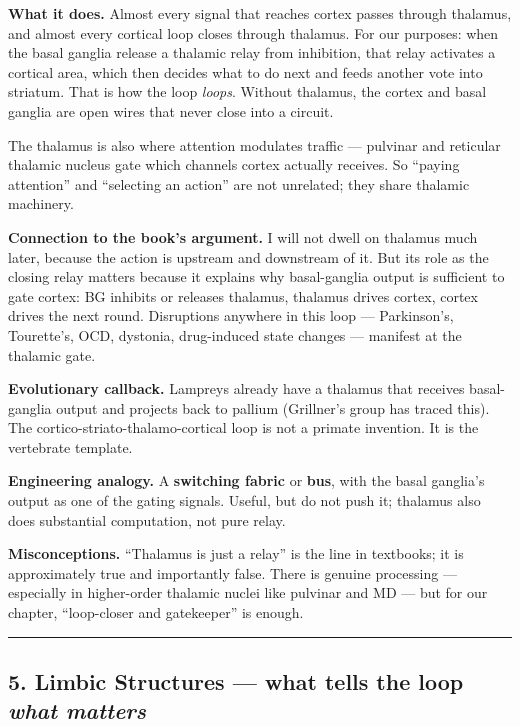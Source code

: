 \textbf{What it does.} Almost every signal that reaches cortex passes through thalamus, and almost every cortical loop closes through thalamus. For our purposes: when the basal ganglia release a thalamic relay from inhibition, that relay activates a cortical area, which then decides what to do next and feeds another vote into striatum. That is how the loop \emph{loops}. Without thalamus, the cortex and basal ganglia are open wires that never close into a circuit.

The thalamus is also where attention modulates traffic --- pulvinar and reticular thalamic nucleus gate which channels cortex actually receives. So ``paying attention'' and ``selecting an action'' are not unrelated; they share thalamic machinery.

\textbf{Connection to the book's argument.} I will not dwell on thalamus much later, because the action is upstream and downstream of it. But its role as the closing relay matters because it explains why basal-ganglia output is sufficient to gate cortex: BG inhibits or releases thalamus, thalamus drives cortex, cortex drives the next round. Disruptions anywhere in this loop --- Parkinson's, Tourette's, OCD, dystonia, drug-induced state changes --- manifest at the thalamic gate.

\textbf{Evolutionary callback.} Lampreys already have a thalamus that receives basal-ganglia output and projects back to pallium (Grillner's group has traced this). The cortico-striato-thalamo-cortical loop is not a primate invention. It is the vertebrate template.

\textbf{Engineering analogy.} A \textbf{switching fabric} or \textbf{bus}, with the basal ganglia's output as one of the gating signals. Useful, but do not push it; thalamus also does substantial computation, not pure relay.

\textbf{Misconceptions.} ``Thalamus is just a relay'' is the line in textbooks; it is approximately true and importantly false. There is genuine processing --- especially in higher-order thalamic nuclei like pulvinar and MD --- but for our chapter, ``loop-closer and gatekeeper'' is enough.

\begin{center}\rule{0.5\linewidth}{0.5pt}\end{center}

\subsection{\texorpdfstring{5. Limbic Structures --- what tells the loop \emph{what matters}}{5. Limbic Structures --- what tells the loop what matters}}\label{06_neurology_101-limbic-structures-what-tells-the-loop-what-matters}

